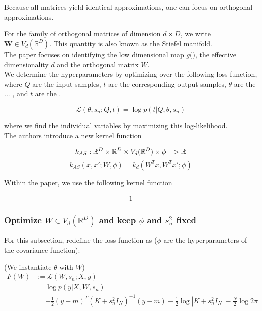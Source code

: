 Because all matrices yield identical approximations, one can focus on orthogonal approximations.

For the family of orthogonal matrices of dimension $d \times D$, we write $\mathbf{W} \in V_d(\mathbb{R}^D) $.
This quantity is also known as the Stiefel manifold. \\

The paper focuses on identifying the low dimensional map $g( \dot )$, the effective dimensionality $d$ and the orthogonal matrix $W$.\\

We determine the hyperparameters by optimizing over the following loss function, where $Q$ are the input samples, $t$ are the corresponding output samples, $\theta$ are the ... , and $t$ are the .

$$
\mathcal{L} (\theta, s_n; Q, t) = \log p(t | Q, \theta, s_n)
$$

where we find the individual variables by maximizing this log-likelihood. \\

The authors introduce a new kernel function 

\begin{equation}
k_{AS} : \mathbb{R}^D \times \mathbb{R}^D \times V_d(\mathbb{R}^D) \times \phi -> \mathbb{R} \\
\end{equation}
\begin{equation}
k_{AS} (x, x'; W, \phi) = k_d(W^T x, W^T x'; \phi)
\end{equation}

Within the paper, we use the following kernel function

\begin{align}
1
\end{align}

\subsubsection{Optimize $W \in V_d(\mathbb{R}^D)$ and keep $\phi$ and $s_n^2$ fixed}

For this subsection, redefine the loss function as ($\phi$ are the hyperparameters of the covariance function):

(We instantiate $\theta$ with $W$)
\begin{align}
F(W) &:= \mathcal{L}(W, s_n; X, y) \\
& = \log p(y | X, W, s_n) \\
& =  -\frac{1}{2} (y - m)^T (K + s_n^2 I_N)^{-1} (y - m) -\frac{1}{2} \log|K + s_n^2 I_N| -\frac{N}{2} \log 2 \pi   \\
\end{align}

